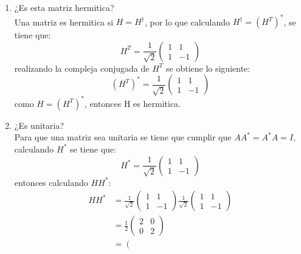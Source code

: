 \documentclass[12pt,letterpaper]{report}
\begin{document}
\begin{enumerate}
    \item ¿Es esta matriz hermitica?\\
    Una matriz es hermitica si $H=H^\dagger$, por lo que calculando $H^\dagger = (H^T)^*$, se tiene que:
    \begin{equation*}
        H^T= \frac{1}{\sqrt{2}} \left(\begin{matrix}
            1 & 1 \\
            1 & -1
        \end{matrix}\right)
    \end{equation*}
    realizando la compleja conjugada de $H^T$ se obtiene lo siguiente:
    \begin{equation*}
        (H^T)^*= \frac{1}{\sqrt{2}} \left(\begin{matrix}
            1 & 1 \\
            1 & -1
        \end{matrix}\right)
    \end{equation*}
    como $H=(H^T)^*$, entonces H es hermitica.
    \item ¿Es unitaria?\\
    Para que una matriz sea unitaria se tiene que cumplir que $AA^*=A^*A=I$, calculando $H^*$ se tiene que:
    \begin{equation*}
        H^*= \frac{1}{\sqrt{2}} \left(\begin{matrix}
            1 & 1 \\
            1 & -1
        \end{matrix}\right)
    \end{equation*}
    entonces calculando $HH^*$:
    \begin{align*}
        HH^*&= \frac{1}{\sqrt{2}} \left(\begin{matrix}
            1 & 1 \\
            1 & -1
        \end{matrix}\right)\frac{1}{\sqrt{2}} \left(\begin{matrix}
            1 & 1 \\
            1 & -1
        \end{matrix}\right)  \\
        & =\frac{1}{2} \left(\begin{matrix}
            2 & 0 \\
            0 & 2
        \end{matrix}\right)\\
        & = \left(\begin{matrix}

\end{matrix}
\end{align*}
\end{enumerate}
\end{document}
